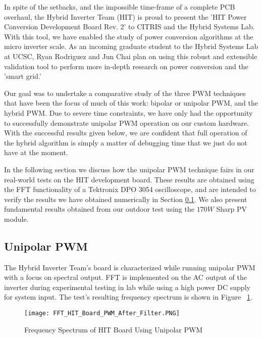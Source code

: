 In spite of the setbacks, and the impossible time-frame of a complete PCB overhaul, the Hybrid Inverter Team (HIT) is proud to present the 'HIT Power Conversion Development Board Rev. 2' to CITRIS and the Hybrid Systems Lab. With this tool, we have enabled the study of power conversion algorithms at the micro inverter scale. As an incoming graduate student to the Hybrid Systems Lab at UCSC, Ryan Rodriguez and Jun Chai plan on using this robust and extensible validation tool to perform more in-depth research on power conversion and the 'smart grid.' 

Our goal was to undertake a comparative study of the three PWM techniques that have been the focus of much of this work: bipolar or unipolar PWM, and the hybrid PWM. 
Due to severe time constraints, we have only had the opportunity to successfully demonstrate unipolar PWM operation on our custom hardware. With the successful results given below, we are confident that full operation of the hybrid algorithm is simply a matter of debugging time that we just do not have at the moment.


In the following section we discuss how the unipolar PWM technique fairs in our real-world tests on the HIT development board. These results are obtained using the FFT functionality of a Tektronix DPO 3054 oscilloscope, and are intended to verify the results we have obtained numerically in Section \ref{uniSection}. We also present fundamental results obtained from our outdoor test using the $170W$ Sharp PV module.


\subsection{Unipolar PWM}
\label{uniSection}
The Hybrid Inverter Team's board is characterized while running unipolar PWM with a focus on spectral output. FFT is implemented on the AC output of the inverter during experimental testing in lab while using a high power DC supply for system input. The test's resulting frequency spectrum is shown in Figure ~\ref{FFT HIT Board PWM After Filter}.

\begin{figure}[h]
\centering
\texttt{[image: FFT\_HIT\_Board\_PWM\_After\_Filter.PNG]}
\caption{Frequency Spectrum of HIT Board Using Unipolar PWM}
\label{FFT HIT Board PWM After Filter}
\end{figure}


